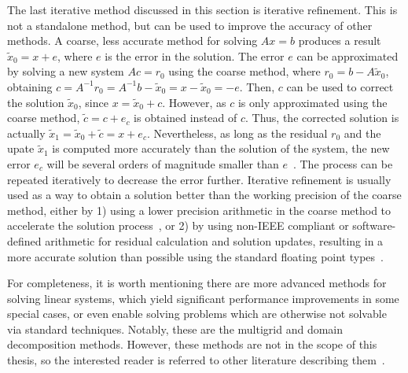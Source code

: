 The last iterative method discussed in this section is iterative refinement.
This is not a standalone method, but can be used to improve the accuracy
of other methods. A coarse, less accurate method for solving $Ax = b$ produces a
result $\tilde{x}_0 = x + e$, where $e$ is the error in the solution.  The error
$e$ can be approximated by solving a new system $Ac = r_0$ using the coarse
method, where $r_0 = b - A\tilde{x}_0$, obtaining $c = A^{-1}r_0 = A^{-1}b -
\tilde{x}_0 = x - \tilde{x}_0 = -e$. Then, $c$ can be used to correct the
solution $\tilde{x}_0$, since $x = \tilde{x}_0 + c$. However, as $c$ is only
approximated using the coarse method, $\tilde{c} = c + e_c$ is obtained instead
of $c$. Thus, the corrected solution is actually $\tilde{x}_1 = \tilde{x}_0 +
\tilde{c} = x + e_c$. Nevertheless, as long as the residual $r_0$ and the upate
$\tilde{x}_1$ is computed more accurately than the solution of the system, the
new error $e_c$ will be several orders of magnitude smaller than
$e$~\cite{demmel,saad}. The process can be repeated iteratively to decrease the
error further. Iterative refinement is usually used as a way to obtain a
solution better than the working precision of the coarse method, either by 1)
using a lower precision arithmetic in the coarse method to accelerate the
solution process~\cite{higham-ir,anzt-ir}, or 2) by using non-IEEE compliant or
software-defined arithmetic for residual calculation and solution updates,
resulting in a more accurate solution than possible using the standard floating
point types~\cite{demmel}.

For completeness, it is worth mentioning there are more advanced methods for
solving linear systems, which yield significant performance improvements in some
special cases, or even enable solving problems which are otherwise not solvable
via standard techniques. Notably, these are the multigrid and domain
decomposition methods. However, these methods are not in the scope of this
thesis, so the interested reader is referred to other literature describing
them~\cite{demmel,saad}.

